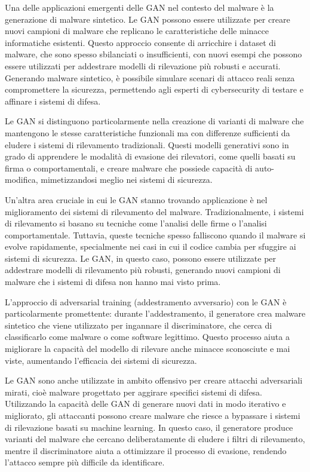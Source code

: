 
Una delle applicazioni emergenti delle GAN nel contesto del malware è la generazione di malware sintetico. Le GAN possono essere utilizzate per creare nuovi campioni di malware che replicano le caratteristiche delle minacce informatiche esistenti. Questo approccio consente di arricchire i dataset di malware, che sono spesso sbilanciati o insufficienti, con nuovi esempi che possono essere utilizzati per addestrare modelli di rilevazione più robusti e accurati. Generando malware sintetico, è possibile simulare scenari di attacco reali senza compromettere la sicurezza, permettendo agli esperti di cybersecurity di testare e affinare i sistemi di difesa.

Le GAN si distinguono particolarmente nella creazione di varianti di malware che mantengono le stesse caratteristiche funzionali ma con differenze sufficienti da eludere i sistemi di rilevamento tradizionali. Questi modelli generativi sono in grado di apprendere le modalità di evasione dei rilevatori, come quelli basati su firma o comportamentali, e creare malware che possiede capacità di auto-modifica, mimetizzandosi meglio nei sistemi di sicurezza.


Un'altra area cruciale in cui le GAN stanno trovando applicazione è nel miglioramento dei sistemi di rilevamento del malware. Tradizionalmente, i sistemi di rilevamento si basano su tecniche come l'analisi delle firme o l'analisi comportamentale. Tuttavia, queste tecniche spesso falliscono quando il malware si evolve rapidamente, specialmente nei casi in cui il codice cambia per sfuggire ai sistemi di sicurezza. Le GAN, in questo caso, possono essere utilizzate per addestrare modelli di rilevamento più robusti, generando nuovi campioni di malware che i sistemi di difesa non hanno mai visto prima.

L'approccio di adversarial training (addestramento avversario) con le GAN è particolarmente promettente: durante l'addestramento, il generatore crea malware sintetico che viene utilizzato per ingannare il discriminatore, che cerca di classificarlo come malware o come software legittimo. Questo processo aiuta a migliorare la capacità del modello di rilevare anche minacce sconosciute e mai viste, aumentando l'efficacia dei sistemi di sicurezza.

Le GAN sono anche utilizzate in ambito offensivo per creare attacchi adversariali mirati, cioè malware progettato per aggirare specifici sistemi di difesa. Utilizzando la capacità delle GAN di generare nuovi dati in modo iterativo e migliorato, gli attaccanti possono creare malware che riesce a bypassare i sistemi di rilevazione basati su machine learning. In questo caso, il generatore produce varianti del malware che cercano deliberatamente di eludere i filtri di rilevamento, mentre il discriminatore aiuta a ottimizzare il processo di evasione, rendendo l'attacco sempre più difficile da identificare.


